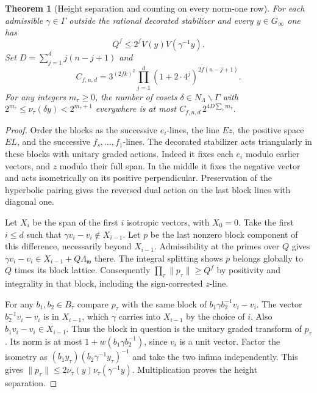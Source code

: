 \documentclass[a4paper,11pt]{article}
\newtheorem{theorem}[proposition]{Theorem}
\theoremstyle{definition}
\theoremstyle{remark}
\numberwithin{equation}{section}
\begin{document}
\begin{theorem}[Height separation and counting on every norm-one row]
\leavevmode\label{thm:uniformheight552}
For each admissible \(\gamma\in\Gamma\) outside the rational
decorated stabilizer and every \(y\in G_\infty\) one has
\[
                  Q^f\le2^f V(y)V(\gamma^{-1}y).
\]
Set \(D=\sum_{j=1}^d j(n-j+1)\) and
\[
       C_{f,n,d}=3^{(2fk)^2}
             \prod_{j=1}^d(1+2\cdot4^j)^{2f(n-j+1)} .
\]
For any integers \(m_\tau\ge0\), the number of cosets
\(\delta\in N_\Lambda\backslash\Gamma\) with
\(2^{m_\tau}\le\nu_\tau(\delta y)<2^{m_\tau+1}\) everywhere
is at most \(C_{f,n,d}\,2^{4D\sum_\tau m_\tau}\).
\end{theorem}
\begin{proof}
Order the blocks as the successive \(e_i\)-lines, the line
\(E z\), the positive space \(EL\), and the successive
\(f_s,\ldots,f_1\)-lines. The decorated stabilizer acts
triangularly in these blocks with unitary graded actions.
Indeed it fixes each \(e_i\) modulo earlier vectors, and \(z\)
modulo their full span. In the middle it fixes the negative
vector and acts isometrically on its positive perpendicular.
Preservation of the hyperbolic pairing gives the reversed
dual action on the last block lines with diagonal one.

Let \(X_i\) be the span of the first \(i\) isotropic vectors,
with \(X_0=0\). Take the first \(i\le d\) such that
\(\gamma v_i-v_i\notin X_{i-1}\). Let \(p\) be the last
nonzero block component of this difference, necessarily beyond
\(X_{i-1}\). Admissibility at the primes over \(Q\) gives
\(\gamma v_i-v_i\in X_{i-1}+Q\Lambda_{\mathfrak w}\) there.
The integral splitting shows \(p\) belongs globally to \(Q\)
times its block lattice. Consequently
\(\prod_\tau\|p_\tau\|\ge Q^f\) by positivity and integrality
in that block, including the sign-corrected \(z\)-line.

For any \(b_1,b_2\in B_\tau\) compare \(p_\tau\) with the
same block of \(b_1\gamma b_2^{-1}v_i-v_i\). The vector
\(b_2^{-1}v_i-v_i\) is in \(X_{i-1}\), which \(\gamma\)
carries into \(X_{i-1}\) by the choice of \(i\). Also
\(b_1v_i-v_i\in X_{i-1}\). Thus the block in question is
the unitary graded transform of \(p_\tau\). Its norm is
at most \(1+w(b_1\gamma b_2^{-1})\), since \(v_i\) is a
unit vector. Factor the isometry as
\((b_1 y_\tau)(b_2\gamma^{-1}y_\tau)^{-1}\) and take the
two infima independently. This gives
\(\|p_\tau\|\le2\nu_\tau(y)\nu_\tau(\gamma^{-1}y)\).
Multiplication proves the height separation.


\end{proof}
\end{document}
